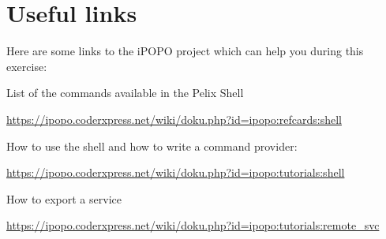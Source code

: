 \documentclass[a4paper, 12pt]{article}
\let\tempone\itemize
\let\temptwo\enditemize
\renewenvironment{itemize}{\tempone\addtolength{\itemsep}{-.5em}}{\temptwo}
\begin{document}
\section{Useful links}

Here are some links to the iPOPO project which can help you during this exercise:
\begin{itemize}
\item List of the commands available in the Pelix Shell\\
\begin{footnotesize}
\url{https://ipopo.coderxpress.net/wiki/doku.php?id=ipopo:refcards:shell}
\end{footnotesize}

\item How to use the shell and how to write a command provider:\\
\begin{footnotesize}
\url{https://ipopo.coderxpress.net/wiki/doku.php?id=ipopo:tutorials:shell} 
\end{footnotesize}

\item How to export a service\\
\begin{footnotesize}
\url{https://ipopo.coderxpress.net/wiki/doku.php?id=ipopo:tutorials:remote_svc} 
\end{footnotesize}
\end{itemize}
\end{document}
